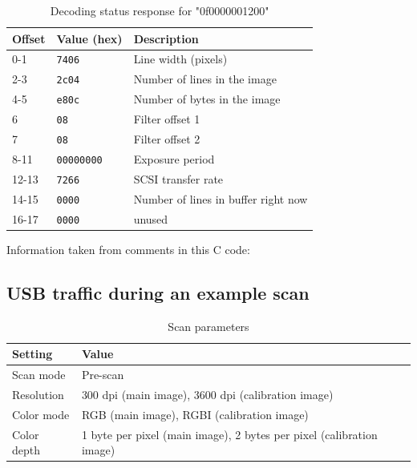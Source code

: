 \documentclass{article}
\begin{document}
\begin{table}[H]
  \caption{Decoding status response for "0f0000001200"}
  \centering
  \begin{tabular}{p{1cm} | p{2cm} | p{7cm}}
    Offset & Value (hex) & Description \\ \hline
    0-1 & {\tt 7406} & Line width (pixels) \\
    2-3 & {\tt 2c04} & Number of lines in the image \\
    4-5 & {\tt e80c} & Number of bytes in the image \\
    6 & {\tt 08} & Filter offset 1 \\
    7 & {\tt 08} & Filter offset 2 \\
    8-11 & {\tt 00000000} & Exposure period \\
    12-13 & {\tt 7266} & SCSI transfer rate \\
    14-15 & {\tt 0000} & Number of lines in buffer right now \\
    16-17 & {\tt 0000} & unused \\
  \end{tabular}
  
  \vspace{5mm}
  Information taken from comments in this C code: \cite[\texttt{pieusb\_scancmd.c}]{sane_code}
  \label{table:imageparam_query}
\end{table}


\subsection{USB traffic during an example scan}
\label{appendix_actualscan}

\begin{table}[H]
  \caption{Scan parameters}
  \centering
  \begin{tabular}{p{4cm} | p{4cm}}
    Setting & Value \\ \hline
    Scan mode & Pre-scan \\
    Resolution & 300 dpi (main image), 3600 dpi (calibration image) \\
    Color mode & RGB (main image), RGBI (calibration image) \\
    Color depth & 1 byte per pixel (main image), 2 bytes per pixel (calibration image) \\
    \end{tabular}
\end{table}
\end{document}
